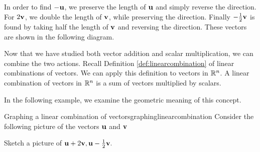 \begin{solution}

In order to find $-{\bf u}$, we preserve the length of ${\bf u}$ and simply reverse the direction.
For $2{\bf v}$, we double the length of ${\bf v}$, while preserving the direction. Finally 
$-\frac{1}{2}{\bf v}$ is found by taking half the length of ${\bf v}$ and reversing the direction. 
These vectors are shown in the following diagram. 

\begin{center}
\end{center}

\end{solution}

Now that we have studied both vector addition and scalar multiplication, we can combine the two actions. Recall 
Definition \ref{def:linearcombination} of linear combinations of vectors. We can apply this definition to 
vectors in $\mathbb{R}^n$. A linear combination of vectors in $\mathbb{R}^n$ is a sum of vectors multiplied by scalars.

In the following example, we examine the geometric meaning of this concept. 

\begin{example}{Graphing a linear combination of vectors}{graphinglinearcombination}
Consider the following picture of the vectors ${\bf u}$ and ${\bf v}$

\begin{center}
\end{center}

Sketch a picture of ${\bf u}+2{\bf v},{\bf u}-\frac{1}{2}{\bf v}.$
\end{example}

